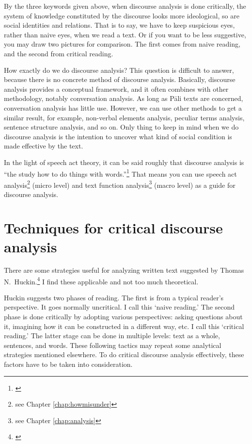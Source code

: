 By the three keywords given above, when discourse analysis is done critically, the system of knowledge constituted by the discourse looks more ideological, so are social identities and relations. That is to say, we have to keep suspicious eyes, rather than naive eyes, when we read a text. Or if you want to be less suggestive, you may draw two pictures for comparison. The first comes from naive reading, and the second from critical reading.

How exactly do we do discourse analysis? This question is difficult to answer, because there is no concrete method of discourse analysis. Basically, discourse analysis provides a conceptual framework, and it often combines with other methodology, notably conversation analysis. As long as P\=ali texts are concerned, conversation analysis has little use. However, we can use other methods to get a similar result, for example, non-verbal elements analysis, peculiar terms analysis, sentence structure analysis, and so on. Only thing to keep in mind when we do discourse analysis is the intention to uncover what kind of social condition is made effective by the text.

In the light of speech act theory, it can be said roughly that discourse analysis is ``the study how to do things with words.''\footnote{\citealp[p.~134]{hjelm:discourse}} That means you can use speech act analysis\footnote{see Chapter \ref{chap:howmisunder}} (micro level) and text function analysis\footnote{see Chapter \ref{chap:analysis}} (macro level) as a guide for discourse analysis.

\clearpage
{}
{}
\section*{Techniques for critical discourse analysis}

There are some strategies useful for analyzing written text suggested by Thomas N.\ Huckin.\footnote{\citealp{huckin:cda}} I find these applicable and not too much theoretical. 

Huckin suggests two phases of reading. The first is from a typical reader's perspective. It goes normally uncritical. I call this `naive reading.' The second phase is done critically by adopting various perspectives: asking questions about it, imagining how it can be constructed in a different way, etc. I call this `critical reading.' The latter stage can be done in multiple levels: text as a whole, sentences, and words. These following tactics may repeat some analytical strategies mentioned elsewhere. To do critical discourse analysis effectively, these factors have to be taken into consideration.

